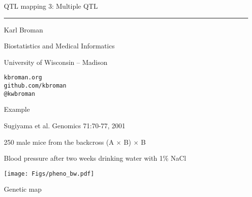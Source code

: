 \documentclass[12pt]{article}
\newcommand{\titlesize}{\fontsize{40}{50} \selectfont}
\newcommand{\headsize}{\fontsize{35}{35} \selectfont}
\newcommand{\textsize}{\fontsize{30}{35} \selectfont}
\newcommand{\smallsize}{\fontsize{25}{30} \selectfont}
\newcommand{\smallersize}{\fontsize{20}{25} \selectfont}
\newcommand{\smallestsize}{\fontsize{18}{22} \selectfont}
\begin{document}
\thispagestyle{empty}

\begin{center}
\titlesize \color{myyellow}

\vspace*{15mm}

QTL mapping 3: Multiple QTL

\color{mypink}
\rule{10in}{1mm}

\vspace{5mm}

\textsize \color{myblue}
Karl Broman
\vspace{5mm}

\color{mywhite}
{\smallsize Biostatistics and Medical Informatics

University of Wisconsin -- Madison
\vspace{20mm}


{\tt kbroman.org} \\[3pt]
{\tt github.com/kbroman} \\
{\tt @kwbroman}
}

\end{center}


\newpage

\headsize \color{myyellow}
\hfill \begin{minipage}{5.75in}
\centering
Example
\end{minipage}

\vspace{30mm}

\hfill
\begin{minipage}{10in}
\smallersize \color{mywhite}
Sugiyama et al. Genomics 71:70-77, 2001

\vspace{16pt}

\smallestsize
\color{myblue}
250 male mice from the backcross (A $\times$ B) $\times$ B

Blood pressure after two weeks drinking water with 1\% NaCl
\end{minipage}

\vspace{15mm}


\centerline{\texttt{[image: Figs/pheno\_bw.pdf]}}

\newpage

\headsize \color{myyellow}
\hfill \begin{minipage}{5.75in}
\centering
Genetic map
\end{minipage}
\end{document}

